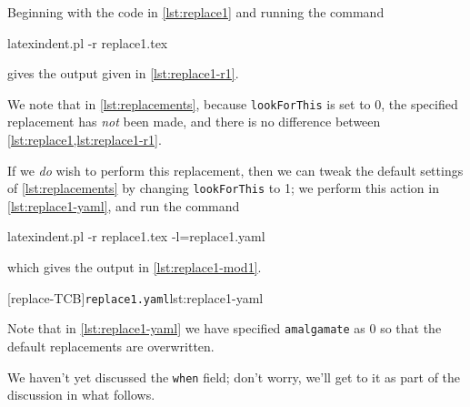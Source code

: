  \begin{example}
 Beginning with the code in \cref{lst:replace1} and running the command 

 \begin{commandshell}
latexindent.pl -r replace1.tex
\end{commandshell}

 gives the output given in \cref{lst:replace1-r1}.

 \begin{cmhtcbraster}[raster column skip=.01\linewidth]
 \end{cmhtcbraster}

 We note that in \cref{lst:replacements}, because \texttt{lookForThis} is set to 0, the specified replacement 
 has \emph{not} been made, and there is no difference between \cref{lst:replace1,lst:replace1-r1}.

 If we \emph{do} wish to perform this replacement, then we can tweak the default settings of
 \vref{lst:replacements} by changing \texttt{lookForThis} to 1; we perform this action in
 \cref{lst:replace1-yaml}, and run the command 

 \begin{commandshell}
latexindent.pl -r replace1.tex -l=replace1.yaml
\end{commandshell}

 which gives the output in \cref{lst:replace1-mod1}.

 \begin{cmhtcbraster}[raster column skip=.01\linewidth]
  [replace-TCB]{\texttt{replace1.yaml}}{lst:replace1-yaml}
 \end{cmhtcbraster}

 Note that in \cref{lst:replace1-yaml} we have specified \texttt{amalgamate} as 0 so that
 the default replacements are overwritten.
 \end{example}

 We haven't yet discussed the \texttt{when} field; don't worry, we'll get to it as part of
 the discussion in what follows.

